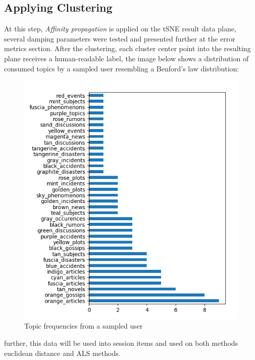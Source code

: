 \documentclass[ecp,tc,english]{iiufrgs}
\begin{document}
        \subsection{Applying Clustering}
        At this step, \textit{Affinity propagation} is applied on the tSNE result data plane, several damping parameters were tested and presented further at the error metrics section. 
        After the clustering, each cluster center point into the resulting plane receives a human-readable label, the image below shows a distribution of consumed topics by a sampled user resembling a 
        Benford's law distribution:
        
        \begin{figure}[H]
            \centering
            \includegraphics{images/frequencies.png}
            \caption{Topic frequencies from a sampled user}
            \label{fig:topic_frequency}
        \end{figure}
    
        further, this data will be used into session items and used on both methods euclidean distance and ALS methods.
        
\end{document}
